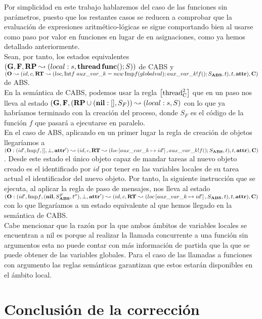 Por simplicidad en este trabajo hablaremos del caso de las funciones sin parámetros, puesto que los restantes casos se reducen a comprobar que la evaluación de expresiones aritmético-lógicas se sigue comportando bien al usarse como paso por valor en funciones en lugar de en asignaciones, como ya hemos detallado anteriormente.\\

Sean, por tanto, los estados equivalentes $(\mathbf{G}, \mathbf{F}, \textbf{RP} \leadsto (local:s, \textbf{thread} \,\textbf{func}()\mbox{;\,}S))$ de CABS y $(\mathbf{O} \leadsto (id, c, \textbf{RT} \leadsto (loc,  \mbox{Int$f$ } aux\_var\_k = new\, \mbox{Imp$f$}(globalval)\mbox{;\,} aux\_var\_k!f()\mbox{;\,} S_{\textbf{ABS}}, t), t, \textbf{attr}), \mathbf{C})$ de ABS.\\

En la semántica de CABS, podemos usar la regla $\left[ \text{thread}_{\text{C}}^2 \right]$ que en un paso nos lleva al estado $(\mathbf{G}, \mathbf{F}, (\textbf{RP} \cup (\textbf{nil}:[], S_F)) \leadsto (local:s, S)$ con lo que ya habríamos terminado con la creación del proceso, donde $S_F$ es el código de la función $f$ que pasará a ejecutarse en paralelo.\\

En el caso de ABS, aplicando en un primer lugar la regla de creación de objetos llegaríamos a $(\mathbf{O}:(id', \mbox{Imp$f$}, [], \perp, \textbf{attr}') \leadsto (id, c, \textbf{RT} \leadsto (loc \left[ aux\_var\_k\mapsto id' \right], aux\_var\_k!f()\mbox{;\,} S_{\textbf{ABS}}, t), t, \textbf{attr}), \mathbf{C})$. Desde este estado el único objeto capaz de mandar tareas al nuevo objeto creado es el identificado por $id$ por tener en las variables locales de su tarea actual el identificador del nuevo objeto. Por tanto, la siguiente instrucción que se ejecuta, al aplicar la regla de paso de mensajes, nos lleva al estado $(\mathbf{O}:(id', \mbox{Imp$f$}, (\textbf{nil}, S_{\textbf{ABS}}^F, t''), \perp, \textbf{attr}') \leadsto (id, c, \textbf{RT} \leadsto (loc \left[ aux\_var\_k\mapsto id' \right], S_{\textbf{ABS}}, t), t, \textbf{attr}), \mathbf{C})$ con lo que llegaríamos a un estado equivalente al que hemos llegado en la semántica de CABS.\\

Cabe mencionar que la razón por la que ambos ámbitos de variables locales se encuentran a nil es porque al realizar la llamada concurrente a una función sin argumentos esta no puede contar con más información de partida que la que se puede obtener de las variables globales. Para el caso de las llamadas a funciones con argumento las reglas semánticas garantizan que estos estarán disponibles en el ámbito local.

\section{Conclusión de la corrección}

